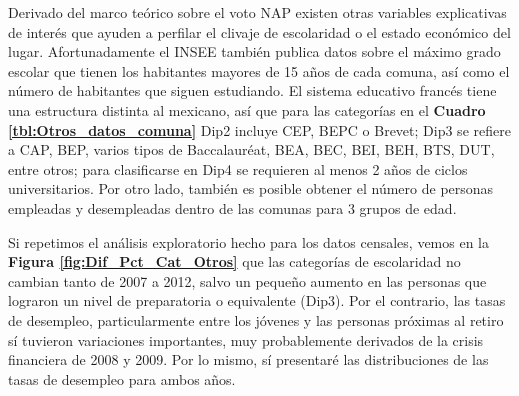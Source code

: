 Derivado del marco teórico sobre el voto NAP existen otras variables explicativas de interés que ayuden a perfilar el clivaje de escolaridad o el estado económico del lugar. Afortunadamente el INSEE también publica datos sobre el máximo grado escolar que tienen los habitantes mayores de 15 años de cada comuna, así como el número de habitantes que siguen estudiando. El sistema educativo francés tiene una estructura distinta al mexicano, así que para las categorías en el \textbf{Cuadro \ref{tbl:Otros_datos_comuna}} Dip2 incluye CEP, BEPC o Brevet; Dip3 se refiere a CAP, BEP, varios tipos de Baccalauréat, BEA, BEC, BEI, BEH, BTS, DUT, entre otros; para clasificarse en Dip4 se requieren al menos 2 años de ciclos universitarios. Por otro lado, también es posible obtener el número de personas empleadas y desempleadas dentro de las comunas para 3 grupos de edad.\\ 

\begin{table}[h]
\centering
{}
\caption{Otros datos a nivel comuna a utilizar en el análisis.}
\label{tbl:Otros_datos_comuna}
\end{table}

Si repetimos el análisis exploratorio hecho para los datos censales, vemos en la \textbf{Figura \ref{fig:Dif_Pct_Cat_Otros}} que las categorías de escolaridad no cambian tanto de 2007 a 2012, salvo un pequeño aumento en las personas que lograron un nivel de preparatoria o equivalente (Dip3). Por el contrario, las tasas de desempleo, particularmente entre los jóvenes y las personas próximas al retiro sí tuvieron variaciones importantes, muy probablemente derivados de la crisis financiera de 2008 y 2009. Por lo mismo, sí presentaré las distribuciones de las tasas de desempleo para ambos años.\\

